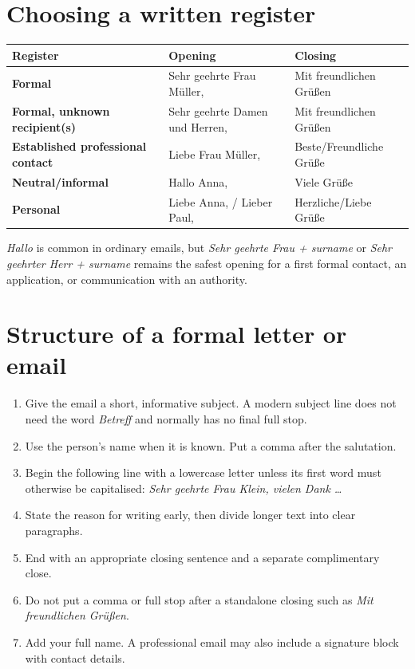 \section{Choosing a written register}

\begin{center}
\small
{}
\begin{tabularx}{\textwidth}{@{}>{\bfseries}l X X@{}}
\toprule
Register & Opening & Closing \\
\midrule
Formal & Sehr geehrte Frau Müller, & Mit freundlichen Grüßen \\
Formal, unknown recipient(s) & Sehr geehrte Damen und Herren, & Mit freundlichen Grüßen \\
Established professional contact & Liebe Frau Müller, & Beste/Freundliche Grüße \\
Neutral/informal & Hallo Anna, & Viele Grüße \\
Personal & Liebe Anna, / Lieber Paul, & Herzliche/Liebe Grüße \\
\bottomrule
\end{tabularx}
\end{center}

\textit{Hallo} is common in ordinary emails, but
\textit{Sehr geehrte Frau + surname} or
\textit{Sehr geehrter Herr + surname} remains the safest opening for a
first formal contact, an application, or communication with an authority.

\section{Structure of a formal letter or email}

\begin{enumerate}[leftmargin=*]
  \item Give the email a short, informative subject. A modern subject line
        does not need the word \textit{Betreff} and normally has no final full
        stop.
  \item Use the person's name when it is known. Put a comma after the
        salutation.
  \item Begin the following line with a lowercase letter unless its first word
        must otherwise be capitalised: \textit{Sehr geehrte Frau Klein,
        vielen Dank \ldots{}}
  \item State the reason for writing early, then divide longer text into clear
        paragraphs.
  \item End with an appropriate closing sentence and a separate complimentary
        close.
  \item Do not put a comma or full stop after a standalone closing such as
        \textit{Mit freundlichen Grüßen}.
  \item Add your full name. A professional email may also include a signature
        block with contact details.
\end{enumerate}


